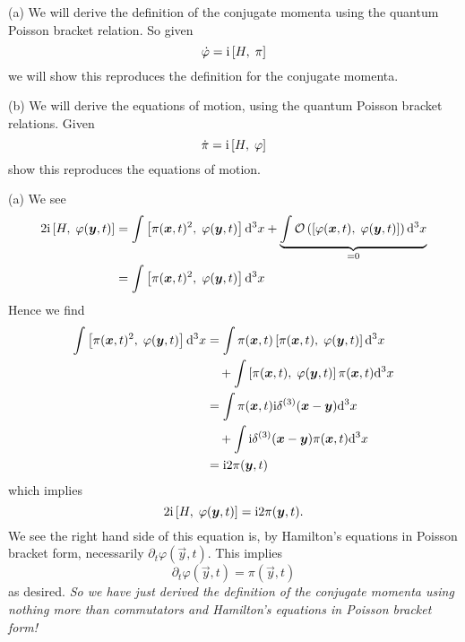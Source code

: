 \begin{xca}
(a) We will derive the definition of the conjugate momenta using the
  quantum Poisson bracket relation. So given
\begin{equation}
\dot{\varphi}=\mathrm{i}\left\lbrack H,\;\pi\right\rbrack
\end{equation}
we will show this reproduces the definition for the conjugate momenta.

(b) We will derive the equations of motion, using the quantum Poisson
bracket relations. Given
\begin{equation}
\dot{\pi}=\mathrm{i}\left\lbrack H,\;\varphi\right\rbrack
\end{equation}
show this reproduces the equations of motion.
\end{xca}
\begin{soln}
(a) We see
\begin{align}
2\I\commutator{H}{\varphi(\vec{y},t)}
&=\int\commutator{\pi(\vec{x},t)^{2}}{\varphi(\vec{y},t)}\D^{3}x
+\underbrace{\int\bigO{\commutator{\varphi(\vec{x},t)}{\varphi(\vec{y},t)}}\D^{3}x}_{=0}\nonumber\\
&=\int\commutator{\pi(\vec{x},t)^{2}}{\varphi(\vec{y},t)}\D^{3}x
\end{align}
Hence we find
\begin{subequations}
\begin{align}
\int\commutator{\pi(\vec{x},t)^{2}}{\varphi(\vec{y},t)}\D^{3}x
&=\int\pi(\vec{x},t)\commutator{\pi(\vec{x},t)}{\varphi(\vec{y},t)}\D^{3}x\nonumber\\
&\quad+\int\commutator{\pi(\vec{x},t)}{\varphi(\vec{y},t)}\pi(\vec{x},t)\D^{3}x\\
&=\int\pi(\vec{x},t)\I\delta^{(3)}(\vec{x}-\vec{y})\D^{3}x\nonumber\\
&\quad+\int\I\delta^{(3)}(\vec{x}-\vec{y})\pi(\vec{x},t)\D^{3}x\\
&=\I 2\pi(\vec{y},t)
\end{align}
\end{subequations}
which implies
\begin{equation}
2\I\commutator{H}{\varphi(\vec{y},t)}=\I 2\pi(\vec{y},t).
\end{equation}
We see the right hand side of this equation is, by Hamilton's equations
in Poisson bracket form, necessarily
$\partial_{t}\varphi(\vec{y},t)$. This implies
\begin{equation}
\partial_{t}\varphi(\vec{y},t)=\pi(\vec{y},t)
\end{equation}
as desired. \emph{So we have just derived the definition of the conjugate momenta using nothing more than commutators and Hamilton's equations in Poisson bracket form!}


\end{soln}
